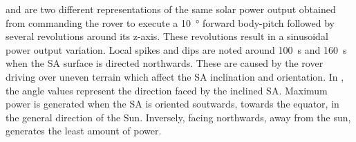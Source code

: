  and  are two different representations of the same solar power output obtained from commanding the rover to execute a \SI{10}{\degree} forward body-pitch followed by several revolutions around its z-axis. These revolutions result in a sinusoidal power output variation. Local spikes and dips are noted around \SI{100}{\second} and \SI{160}{\second} when the \ac{SA} surface is directed northwards. These are caused by the rover driving over uneven terrain which affect the \ac{SA} inclination and orientation. In , the angle values represent the direction faced by the inclined \ac{SA}. Maximum power is generated when the \ac{SA} is oriented soutwards, towards the equator, in the general direction of the Sun. Inversely, facing northwards, away from the sun, generates the least amount of power.

